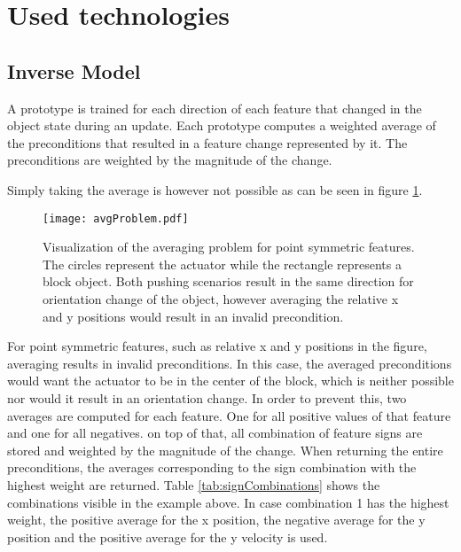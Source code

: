 \section{Used technologies \label{sec:technologies}}

\subsection{Inverse Model \label{sec:invModelRealization}} %


A prototype is trained for each direction of each feature that changed in the object state during an update. Each prototype computes a weighted average of the preconditions that resulted in a feature change represented by it. The preconditions are weighted by the magnitude of the change. 

Simply taking the average is however not possible as can be seen in figure \ref{fig:avgProblem}.

\begin{figure}
	\centering
	\texttt{[image: avgProblem.pdf]}
	\caption{Visualization of the averaging problem for point symmetric features. The circles represent the actuator while the rectangle represents a block object. Both pushing scenarios result in the same direction for orientation change of the object, however averaging the relative x and y positions would result in an invalid precondition.} 
	\label{fig:avgProblem}
\end{figure}

For point symmetric features, such as relative x and y positions in the figure, averaging results in invalid preconditions. In this case, the averaged preconditions would want the actuator to be in the center of the block, which is neither possible nor would it result in an orientation change. In order to prevent this, two averages are computed for each feature. One for all positive values of that feature and one for all negatives. on top of that, all combination of feature signs are stored and weighted by the magnitude of the change. When returning the entire preconditions, the averages corresponding to the sign combination with the highest weight are returned. Table \ref{tab:signCombinations} shows the combinations visible in the example above. In case combination 1 has the highest weight, the positive average for the x position, the negative average for the y position and the positive average for the y velocity is used. 

